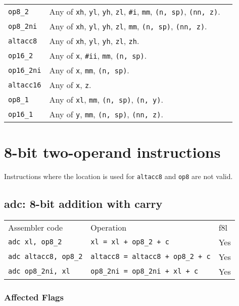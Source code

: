 \documentclass{book}
\begin{document}
\begin{tabular}{l l l}
\texttt{op8\_2} & Any of \texttt{xh}, \texttt{yl}, \texttt{yh}, \texttt{zl}, \texttt{\#i}, \texttt{mm}, \texttt{(n, sp)}, \texttt{(nn, z)}. \\
\texttt{op8\_2ni} & Any of \texttt{xh}, \texttt{yl}, \texttt{yh}, \texttt{zl}, \texttt{mm}, \texttt{(n, sp)}, \texttt{(nn, z)}. \\
\texttt{altacc8} & Any of \texttt{xh}, \texttt{yl}, \texttt{yh}, \texttt{zl}, \texttt{zh}. \\
\texttt{op16\_2} & Any of \texttt{x}, \texttt{\#ii}, \texttt{mm}, \texttt{(n, sp)}. \\
\texttt{op16\_2ni} & Any of \texttt{x}, \texttt{mm}, \texttt{(n, sp)}. \\
\texttt{altacc16} & Any of \texttt{x}, \texttt{z}. \\
\texttt{op8\_1} & Any of \texttt{xl}, \texttt{mm}, \texttt{(n, sp)}, \texttt{(n, y)}. \\
\texttt{op16\_1} & Any of \texttt{y}, \texttt{mm}, \texttt{(n, sp)}, \texttt{(nn, z)}. \\
\end{tabular}

\section{8-bit two-operand instructions}

Instructions where the location is used for \texttt{altacc8} and \texttt{op8} are not valid.

\subsection{adc: 8-bit addition with carry}

\begin{tabular}{l l l}
Assembler code            & Operation                                  & f8l \\
\texttt{adc xl, op8\_2}      & \texttt{xl = xl + op8\_2 + c}           & Yes \\
\texttt{adc altacc8, op8\_2} & \texttt{altacc8 = altacc8 + op8\_2 + c} & Yes \\
\texttt{adc op8\_2ni, xl}    & \texttt{op8\_2ni = op8\_2ni + xl + c}   & Yes
\end{tabular}

\subsubsection*{Affected Flags}
\end{document}
